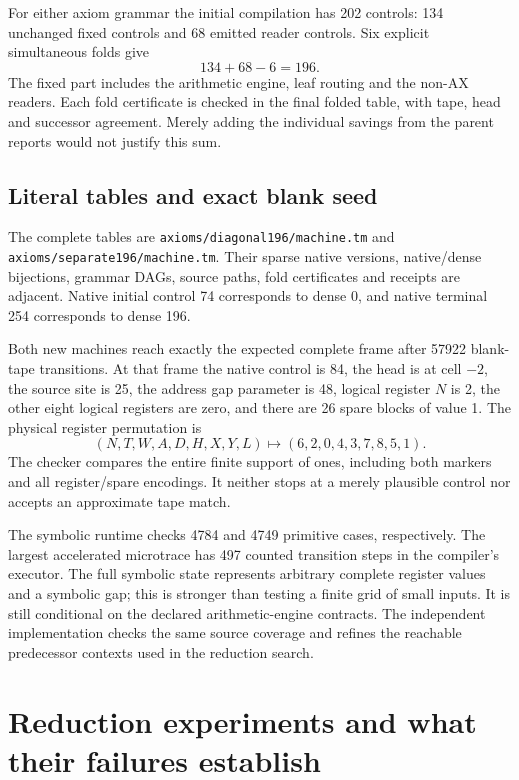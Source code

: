\documentclass[11pt,a4paper]{article}
\newcommand{\file}[1]{\texttt{\nolinkurl{#1}}}
\begin{document}
For either axiom grammar the initial compilation has 202 controls:
134 unchanged fixed controls and 68 emitted reader controls. Six
explicit simultaneous folds give
\[
                       134+68-6=196.
\]
The fixed part includes the arithmetic engine, leaf routing and the
non-AX readers. Each fold certificate is checked in the final folded
table, with tape, head and successor agreement. Merely adding the
individual savings from the parent reports would not justify this sum.

\subsection{Literal tables and exact blank seed}

The complete tables are \file{axioms/diagonal196/machine.tm} and
\file{axioms/separate196/machine.tm}. Their sparse native versions,
native/dense bijections, grammar DAGs, source paths, fold certificates
and receipts are adjacent. Native initial control 74 corresponds to
dense 0, and native terminal 254 corresponds to dense 196.

Both new machines reach exactly the expected complete frame after 57922
blank-tape transitions. At that frame the native control is 84, the
head is at cell $-2$, the source site is 25, the address gap parameter
is 48, logical register $N$ is 2, the other eight logical registers are
zero, and there are 26 spare blocks of value 1. The physical register
permutation is
\[
 (N,T,W,A,D,H,X,Y,L)\longmapsto(6,2,0,4,3,7,8,5,1).
\]
The checker compares the entire finite support of ones, including both
markers and all register/spare encodings. It neither stops at a merely
plausible control nor accepts an approximate tape match.

The symbolic runtime checks 4784 and 4749 primitive cases, respectively.
The largest accelerated microtrace has 497 counted transition steps in
the compiler's executor. The full symbolic state represents arbitrary
complete register values and a symbolic gap; this is stronger than
testing a finite grid of small inputs. It is still conditional on the
declared arithmetic-engine contracts. The independent implementation
checks the same source coverage and refines the reachable predecessor
contexts used in the reduction search.



\section{Reduction experiments and what their failures establish}
\label{sec:experiments}
\end{document}
